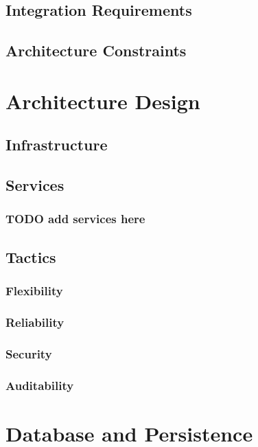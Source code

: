 \documentclass{article}
\begin{document}
	\subsection{Integration Requirements}
	\subsection{Architecture Constraints}

\section{Architecture Design}

\subsection{Infrastructure}

\subsection{Services}

\subsubsection{TODO add services here}

\subsection{Tactics}

\subsubsection{Flexibility}

\subsubsection{Reliability}

\subsubsection{Security}

\subsubsection{Auditability}

\section{Database and Persistence}
\end{document}
